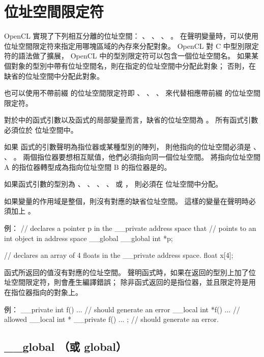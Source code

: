 \section{位址空間限定符}

OpenCL 實現了下列相互分離的位址空間：
 、 、
 、 。
在聲明變量時，可以使用位址空間限定符來指定用哪塊區域的內存來分配對象。
 OpenCL 對 C 中型別限定符的語法做了擴展， OpenCL 中的型別限定符可以包含一個位址空間名。
如果某個對象的型別中帶有位址空間名，則在指定的位址空間中分配此對象；
否則，在缺省的位址空間中分配此對象。

也可以使用不帶前綴 \cqlf{__} 的位址空間限定符即
 、 、 、 
 來代替相應帶前綴 \cqlf{__} 的位址空間限定符。

對於中的函式引數以及函式的局部變量而言，缺省的位址空間為 。
所有函式引數必須位於  位址空間中。

如果  函式的引數聲明為指位器或某種型別的陣列，
則他指向的位址空間必須是 、 、 。
兩個指位器要想相互賦值，他們必須指向同一個位址空間。
將指向位址空間 A 的指位器轉型成為指向位址空間 B 的指位器是的。

如果函式引數的型別為
 、 、 、
 、  或 ，
則必須在  位址空間中分配。

如果變量的作用域是整個，則沒有對應的缺省位址空間。
這樣的變量在聲明時必須加上 。

例：
\startclc
// declares a pointer p in the __private address space that
// points to an int object in address space __global
__global int *p;

// declares an array of 4 floats in the __private address space.
float x[4];
\stopclc

函式所返回的值沒有對應的位址空間。
聲明函式時，如果在返回的型別上加了位址空間限定符，則會產生編譯錯誤；
除非函式返回的是指位器，並且限定符是用在指位器指向的對象上。

例：
\startclc
__private int f() { ... }		// should generate an error
__local int *f() { ... }		// allowed
__local int * __private f() { ... };	// should generate an error.
\stopclc

\subsection{__global （或 global）}

